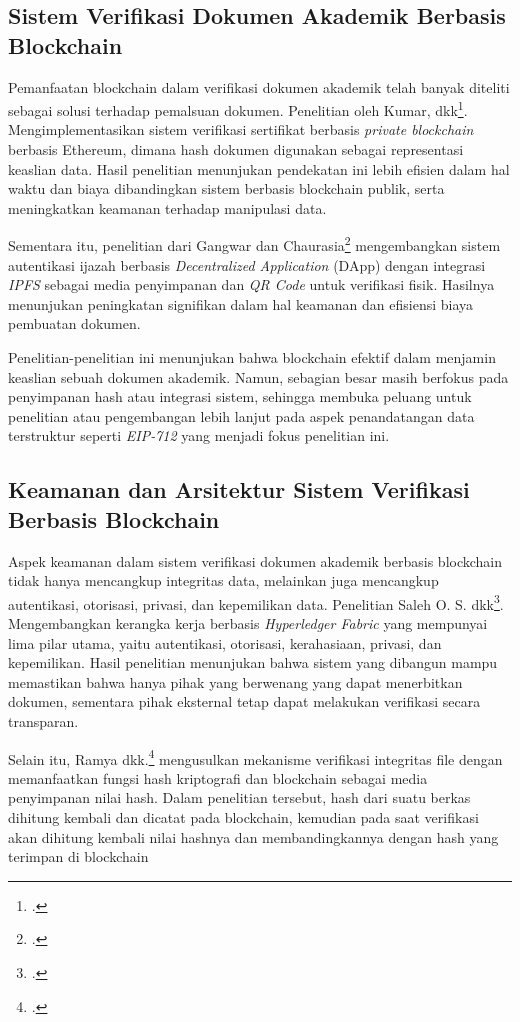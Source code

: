 		
		\subsection{Sistem Verifikasi Dokumen Akademik Berbasis Blockchain}
		Pemanfaatan blockchain dalam verifikasi dokumen akademik telah banyak diteliti sebagai solusi terhadap pemalsuan dokumen. Penelitian oleh Kumar, dkk\footcite{KumarK2020}. Mengimplementasikan sistem verifikasi sertifikat berbasis \textit{private blockchain} berbasis Ethereum, dimana hash dokumen digunakan sebagai representasi keaslian data. Hasil penelitian menunjukan pendekatan ini lebih efisien dalam hal waktu dan biaya dibandingkan sistem berbasis blockchain publik, serta meningkatkan keamanan terhadap manipulasi data.

		Sementara itu, penelitian dari Gangwar dan Chaurasia\footcite{Gangwar2024} mengembangkan sistem autentikasi ijazah berbasis \textit{Decentralized Application} (DApp) dengan integrasi \textit{IPFS} sebagai media penyimpanan dan \textit{QR Code} untuk verifikasi fisik. Hasilnya menunjukan peningkatan signifikan dalam hal keamanan dan efisiensi biaya pembuatan dokumen.

		Penelitian-penelitian ini menunjukan bahwa blockchain efektif dalam menjamin keaslian sebuah dokumen akademik. Namun, sebagian besar masih berfokus pada penyimpanan hash atau integrasi sistem, sehingga membuka peluang untuk penelitian atau pengembangan lebih lanjut pada aspek penandatangan data terstruktur seperti \textit{EIP-712} yang menjadi fokus penelitian ini.

			
		\subsection{Keamanan dan Arsitektur Sistem Verifikasi Berbasis Blockchain}
		Aspek keamanan dalam sistem verifikasi dokumen akademik berbasis blockchain tidak hanya mencangkup integritas data, melainkan juga mencangkup autentikasi, otorisasi, privasi, dan kepemilikan data. Penelitian Saleh O. S. dkk\footcite{Saleh2020}. Mengembangkan kerangka kerja berbasis \textit{Hyperledger Fabric} yang mempunyai lima pilar utama, yaitu autentikasi, otorisasi, kerahasiaan, privasi, dan kepemilikan. Hasil penelitian menunjukan bahwa sistem yang dibangun mampu memastikan bahwa hanya pihak yang berwenang yang dapat menerbitkan dokumen, sementara pihak eksternal tetap dapat melakukan verifikasi secara transparan.
		
		Selain itu, Ramya dkk.\footcite{Ramya2026} mengusulkan mekanisme verifikasi integritas file dengan memanfaatkan fungsi hash kriptografi dan blockchain sebagai media penyimpanan nilai hash. Dalam penelitian tersebut, hash dari suatu berkas dihitung kembali dan dicatat pada blockchain, kemudian pada saat verifikasi akan dihitung kembali nilai hashnya dan membandingkannya dengan hash yang terimpan di blockchain

